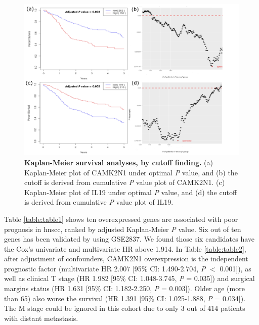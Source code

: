 \documentclass[jpm,article,submit,moreauthors,pdftex]{Definitions/mdpi}
\newcommand{\bcaption}[2]{\caption{\textbf{#1} #2}}
\begin{document}
\begin{figure}[hp]
\centering
\includegraphics[width=15cm]{Figure_4_CAMK2N1_IL19.pdf}
\bcaption{Kaplan-Meier survival analyses, by cutoff finding.}
{(a) Kaplan-Meier plot of CAMK2N1 under optimal \textit{P} value, and (b) the cutoff is derived from cumulative \textit{P} value plot of CAMK2N1. (c) Kaplan-Meier plot of IL19 under optimal \textit{P} value, and (d) the cutoff is derived from cumulative \textit{P} value plot of IL19.}
\label{fig:figure4}
\end{figure}

\clearpage

Table \ref{table:table1} shows ten overexpressed genes are associated with poor prognosis in \acrshort{hnscc}, ranked by adjusted Kaplan-Meier \textit{P} value.
Six out of ten genes has been validated by using GSE2837.
We found those six candidates have the Cox's univariate and multivariate HR above 1.914.
In Table \ref{table:table2}, %
after adjustment of confounders, \acrshort{CAMK2N1} overexpression is the independent prognostic factor (multivariate HR 2.007 [95\% CI: 1.490-2.704, \textit{P} $<$ 0.001]), as well as clinical T stage (HR 1.982 [95\% CI: 1.048-3.745, \textit{P} = 0.035]) and surgical margins status (HR 1.631 [95\% CI: 1.182-2.250, \textit{P} = 0.003]). 
Older age (more than 65) also worse the survival (HR 1.391 [95\% CI: 1.025-1.888, \textit{P} = 0.034]). 
The M stage could be ignored in this cohort due to only 3 out of 414 patients with distant metastasis.
\end{document}
